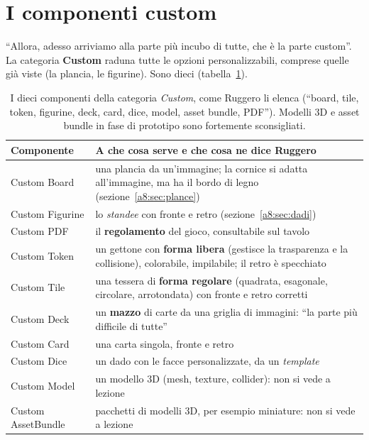 \section{I componenti custom}
\label{a8:sec:custom}

``Allora, adesso arriviamo alla parte più incubo di tutte, che è la parte custom''. La
categoria \textbf{Custom} raduna tutte le opzioni personalizzabili, comprese quelle già
viste (la plancia, le figurine). Sono dieci (tabella~\ref{a8:tab:custom}).

\begin{table}[htbp]
\centering
\small
\begin{tabular}{@{}p{2.6cm}p{10.0cm}@{}}
\toprule
\textbf{Componente} & \textbf{A che cosa serve e che cosa ne dice Ruggero} \\
\midrule
Custom Board & una plancia da un'immagine; la cornice si adatta all'immagine, ma ha
il bordo di legno (sezione~\ref{a8:sec:plance}) \\
Custom Figurine & lo \emph{standee} con fronte e retro (sezione~\ref{a8:sec:dadi}) \\
Custom PDF & il \textbf{regolamento} del gioco, consultabile sul tavolo \\
Custom Token & un gettone con \textbf{forma libera} (gestisce la trasparenza e la
collisione), colorabile, impilabile; il retro è specchiato \\
Custom Tile & una tessera di \textbf{forma regolare} (quadrata, esagonale, circolare,
arrotondata) con fronte e retro corretti \\
Custom Deck & un \textbf{mazzo} di carte da una griglia di immagini: ``la parte più
difficile di tutte'' \\
Custom Card & una carta singola, fronte e retro \\
Custom Dice & un dado con le facce personalizzate, da un \emph{template} \\
Custom Model & un modello 3D (mesh, texture, collider): non si vede a lezione \\
Custom AssetBundle & pacchetti di modelli 3D, per esempio miniature: non si vede a
lezione \\
\bottomrule
\end{tabular}
\caption{I dieci componenti della categoria \emph{Custom}, come Ruggero li elenca
(``board, tile, token, figurine, deck, card, dice, model, asset bundle, PDF''). Modelli
3D e asset bundle in fase di prototipo sono fortemente sconsigliati.}
\label{a8:tab:custom}
\end{table}

